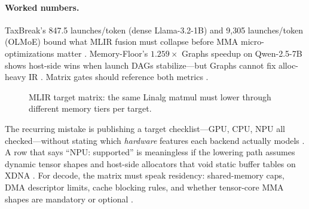 \paragraph{Worked numbers.} TaxBreak's 847.5 launches/token (dense Llama-3.2-1B) and 9,305 launches/token (OLMoE) bound what MLIR fusion must collapse before MMA micro-optimizations matter \citep{taxbreak2026}. Memory-Floor's $1.259\times$ Graphs speedup on Qwen-2.5-7B shows host-side wins when launch DAGs stabilize---but Graphs cannot fix alloc-heavy IR \citep{memoryfloor2026,nvidia2024cudagraphs}. Matrix gates should reference both metrics \citep{yirage2026,chen2020compilerbasedhardw}.

\begin{figure}[t]
\centering
{}
\caption{MLIR target matrix: the same Linalg matmul must lower through different memory tiers per target.}
\label{fig:mlir_hw_matrix_pipeline}
\end{figure}

The recurring mistake is publishing a target checklist---GPU, CPU, NPU all checked---without stating which \emph{hardware} features each backend actually models \citep{nvidia2022hopper,amd2024xdna}. A row that says ``NPU: supported'' is meaningless if the lowering path assumes dynamic tensor shapes and host-side allocators that void static buffer tables on XDNA \citep{amd2024aie}. For decode, the matrix must speak residency: shared-memory caps, DMA descriptor limits, cache blocking rules, and whether tensor-core MMA shapes are mandatory or optional \citep{semianalysis2024tma}.

